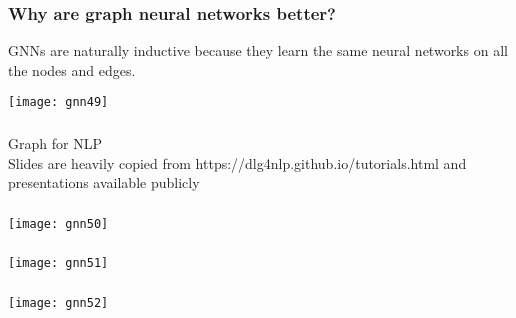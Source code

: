\begin{frame}[fragile]\frametitle{Why are graph neural networks better?}

GNNs are naturally inductive because they learn the same neural networks on all the nodes and edges.


\begin{center}
\texttt{[image: gnn49]}
\end{center}	  

\end{frame}





\begin{frame}[fragile]\frametitle{}
\begin{center}
{\Large Graph for NLP} \\
{\small Slides are heavily copied from https://dlg4nlp.github.io/tutorials.html and presentations available publicly}
\end{center}
\end{frame}

\begin{frame}[fragile]\frametitle{}

\begin{center}
\texttt{[image: gnn50]}
\end{center}	  

\end{frame}

\begin{frame}[fragile]\frametitle{}

\begin{center}
\texttt{[image: gnn51]}
\end{center}	  

\end{frame}

\begin{frame}[fragile]\frametitle{}

\begin{center}
\texttt{[image: gnn52]}
\end{center}	  

\end{frame}

